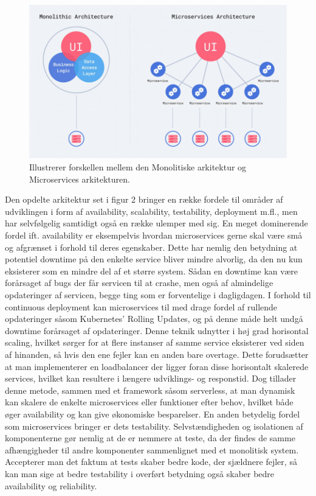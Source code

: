 \documentclass{article}
\begin{document}
\begin{flushleft}
\begin{figure}[H]
    \captionsetup{justification=raggedright,singlelinecheck=false}
    \includegraphics[width=\textwidth]{monolithic and microservices.jpg}
    \caption{Illustrerer forskellen mellem den Monolitiske arkitektur og Microservices arkitekturen.\cite{micro8}  \label{figure:mono micro}}
\end{figure}

Den opdelte arkitektur set i figur 2 bringer en række fordele til områder af udviklingen i form af availability, scalability, testability, deployment m.fl., men har selvfølgelig samtidigt også en række ulemper med sig.\cite{mono2} En meget dominerende fordel ift. availability er eksempelvis hvordan microservices gerne skal være små og afgrænset i forhold til deres egenskaber.\cite{micro1} Dette har nemlig den betydning at potentiel downtime på den enkelte service bliver mindre alvorlig, da den nu kun eksisterer som en mindre del af et større system. Sådan en downtime kan være forårsaget af bugs der får servicen til at crashe, men også af almindelige opdateringer af servicen, begge ting som er forventelige i dagligdagen. I forhold til continuous deployment kan microservices til med drage fordel af rullende opdateringer såsom Kubernetes’ Rolling Updates\cite{micro2}, og på denne måde helt undgå downtime forårsaget af opdateringer. Denne teknik udnytter i høj grad horisontal scaling, hvilket sørger for at flere instanser af samme service eksisterer ved siden af hinanden, så hvis den ene fejler kan en anden bare overtage. Dette forudsætter at man implementerer en loadbalancer der ligger foran disse horisontalt skalerede services, hvilket kan resultere i længere udviklings- og responstid. Dog tillader denne metode, sammen med et framework såsom serverless, at man dynamisk kan skalere de enkelte microservices eller funktioner efter behov, hvilket både øger availability og kan give økonomiske besparelser.\cite{micro3} \linebreak
En anden betydelig fordel som microservices bringer er dets testability. Selvstændigheden  og isolationen af komponenterne gør nemlig at de er nemmere at teste, da der findes de samme afhængigheder til andre komponenter sammenlignet med et monolitisk system.\cite{micro4} Accepterer man det faktum at tests skaber bedre kode, der sjældnere fejler\cite{micro5}, så kan man sige at bedre testability i overført betydning også skaber bedre availability og reliability.\linebreak


\end{flushleft}
\end{document}
